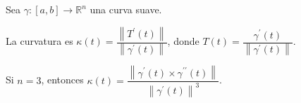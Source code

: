 \begin{frame}
    Sea $\gamma\colon\left[a,b\right]\to\mathbb{R}^{n}$ una curva
    suave.

    \begin{definition}[Curvatura]
        La \alert{curvatura} es
        \begin{math}
            \kappa\left(t\right)=
            \dfrac{
                \left\|
                T^{\prime}\left(t\right)
                \right\|
            }{
                \left\|
                \gamma^{\prime}\left(t\right)
                \right\|
            }
        \end{math},
        donde
        \begin{math}
            T\left(t\right)=
            \dfrac{
                \gamma^{\prime}\left(t\right)
            }{
                \left\|
                \gamma^{\prime}\left(t\right)
                \right\|
            }
        \end{math}.
    \end{definition}

    \begin{theorem}
        Si $n=3$, entonces
        \begin{math}
            \kappa\left(t\right)=
            \dfrac{
                \left\|
                \gamma^{\prime}\left(t\right)\times
                \gamma^{\prime\prime}\left(t\right)
                \right\|
            }{
                {\left\|
                        \gamma^{\prime}\left(t\right)
                        \right\|}^{3}
            }
        \end{math}.
    \end{theorem}


\end{frame}
